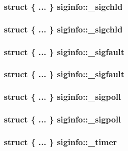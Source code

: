 \subsubsection[{\_\-sigchld}]{\setlength{\rightskip}{0pt plus 5cm}struct \{ ... \}   {\bf siginfo::\_\-sigchld}}\label{structsiginfo_ae9e789075c5bb797adcf7f456305e649}
\subsubsection[{\_\-sigchld}]{\setlength{\rightskip}{0pt plus 5cm}struct \{ ... \}   {\bf siginfo::\_\-sigchld}}\label{structsiginfo_ae769d06a28f2fa861a48b98b28bcd40b}
\subsubsection[{\_\-sigfault}]{\setlength{\rightskip}{0pt plus 5cm}struct \{ ... \}   {\bf siginfo::\_\-sigfault}}\label{structsiginfo_ad5e23dffbee9c3e0d39b681c9e3cb430}
\subsubsection[{\_\-sigfault}]{\setlength{\rightskip}{0pt plus 5cm}struct \{ ... \}   {\bf siginfo::\_\-sigfault}}\label{structsiginfo_a18f356db8c6086dc0b1e20322e601ed9}
\subsubsection[{\_\-sigpoll}]{\setlength{\rightskip}{0pt plus 5cm}struct \{ ... \}   {\bf siginfo::\_\-sigpoll}}\label{structsiginfo_aaaf752a5a8e464e7056f7f4f7ade0555}
\subsubsection[{\_\-sigpoll}]{\setlength{\rightskip}{0pt plus 5cm}struct \{ ... \}   {\bf siginfo::\_\-sigpoll}}\label{structsiginfo_aded5406eeb80f27b5857bcc1c552a9e4}
\subsubsection[{\_\-timer}]{\setlength{\rightskip}{0pt plus 5cm}struct \{ ... \}   {\bf siginfo::\_\-timer}}\label{structsiginfo_a5a2cab68aa3cf96663f5d9a5a134e1d4}
